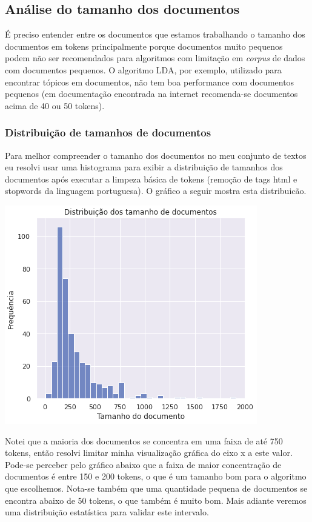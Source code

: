 \subsection{Análise do tamanho dos documentos}

É preciso entender entre os documentos que estamos trabalhando o tamanho dos documentos em tokens principalmente porque documentos 
muito pequenos podem não ser recomendados para algoritmos com limitação em \textit{corpus} de dados com documentos pequenos. 
O algoritmo LDA, por exemplo, utilizado para encontrar tópicos em documentos, não tem boa performance com documentos pequenos 
(em documentação encontrada na internet recomenda-se documentos acima de 40 ou 50 tokens).

\subsubsection{Distribuição de tamanhos de documentos}

Para melhor compreender o tamanho dos documentos no meu conjunto de textos eu resolvi usar uma histograma para exibir a distribuição de 
tamanhos dos documentos após executar a limpeza básica de tokens (remoção de tags html e stopwords da linguagem portuguesa). 
O gráfico a seguir mostra esta distribuicão.

\includegraphics[scale=0.75]{explore/resources/tamanho_documentos.png}

Notei que a maioria dos documentos se concentra em uma faixa de até 750 tokens, então resolvi limitar minha visualização gráfica do eixo 
x a este valor. Pode-se perceber pelo gráfico abaixo que a faixa de maior concentração de documentos é entre 150 e 200 tokens, 
o que é um tamanho bom para o algoritmo que escolhemos. Nota-se também que uma quantidade pequena de documentos se encontra abaixo de 50
tokens, o que também é muito bom. Mais adiante veremos uma distribuição estatística para validar este intervalo.


